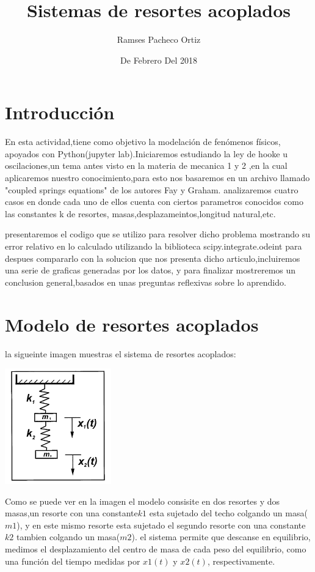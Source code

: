 \documentclass{article}
\begin{document}
\title{Sistemas de resortes acoplados}
\author{Ramses Pacheco Ortiz}
\date{ De Febrero Del 2018}
\maketitle  


\section{Introducción}

En esta actividad,tiene como objetivo la modelación de fenómenos físicos, apoyados con Python(jupyter lab).Iniciaremos estudiando la ley de hooke u oscilaciones,un tema antes visto en la materia de mecanica 1 y 2 ,en la cual aplicaremos nuestro conocimiento,para esto nos basaremos en un archivo llamado "coupled springs equations"
de los autores Fay y Graham.
analizaremos cuatro casos en donde cada uno de ellos cuenta con ciertos parametros conocidos como las constantes k de resortes, masas,desplazameintos,longitud natural,etc.


presentaremos el codigo que se utilizo para resolver dicho problema mostrando su error relativo en lo calculado utilizando la biblioteca scipy.integrate.odeint para despues compararlo con la solucion que nos presenta dicho articulo,incluiremos una serie de  graficas generadas por los datos, y para finalizar mostreremos un conclusion general,basados en unas preguntas reflexivas sobre lo aprendido.

\section{Modelo de resortes acoplados}

la sigueinte imagen muestras el sistema de resortes acoplados:

\begin{center}
\includegraphics[height=5cm]{sistema.PNG}
\end{center}


Como se puede ver en la imagen el modelo consisite en dos resortes y dos masas,un resorte con una constante$k1$ esta sujetado del techo colgando un masa( $m1$), y en este mismo resorte esta sujetado el segundo resorte con una constante $k2$ tambien colgando un masa($m2$).
 el sistema permite que  descanse en equilibrio, medimos el desplazamiento del centro de masa de cada peso del equilibrio, como una función del tiempo medidas por $x1(t)$ y $x2(t)$, respectivamente.
 
\end{document}

